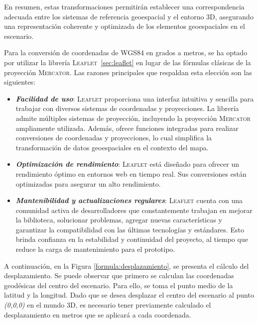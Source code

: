 \documentclass[a4paper, 11pt]{book}
\begin{document}
En resumen, estas transformaciones permitirán establecer una correspondencia adecuada entre los sistemas de referencia geoespacial y el entorno 3D, asegurando una representación coherente y optimizada de los elementos geoespaciales en el escenario.

Para la conversión de coordenadas de \textsc{WGS84} en grados a metros, se ha optado por utilizar la librería \textsc{Leaflet}~\ref{sec:leaflet} en lugar de las fórmulas clásicas de la proyección \textsc{Mercator}. Las razones principales que respaldan esta elección son las siguientes:
\begin{itemize}
    \item \textbf{\emph{Facilidad de uso}}: \textsc{Leaflet} proporciona una interfaz intuitiva y sencilla para trabajar con diversos sistemas de coordenadas y proyecciones. La librería admite múltiples sistemas de proyección, incluyendo la proyección \textsc{Mercator} ampliamente utilizada. 
    Además, ofrece funciones integradas para realizar conversiones de coordenadas y proyecciones, lo cual simplifica la transformación de datos geoespaciales en el contexto del mapa.
    \item \textbf{\emph{Optimización de rendimiento}}: \textsc{Leaflet} está diseñado para ofrecer un rendimiento óptimo en entornos web en tiempo real. Sus conversiones están optimizadas para asegurar un alto rendimiento.
    \item \textbf{\emph{Mantenibilidad y actualizaciones regulares}}: \textsc{Leaflet} cuenta con una comunidad activa de desarrolladores que constantemente trabajan en mejorar la biblioteca, solucionar problemas, agregar nuevas características y garantizar la compatibilidad con las últimas tecnologías y estándares. Esto brinda confianza en la estabilidad y continuidad del proyecto, al tiempo que reduce la carga de mantenimiento para el prototipo.
\end{itemize}
A continuación, en la Figura \ref{formula:desplazamiento}, se presenta el cálculo del desplazamiento. Se puede observar que primero se calculan las coordenadas geodésicas del centro del escenario. Para ello, se toma el punto medio de la latitud y la longitud. Dado que se desea desplazar el centro del escenario al punto \emph{(0,0,0)} en el mundo \textsc{3D}, es necesario tener previamente calculado el desplazamiento en metros que se aplicará a cada coordenada.
\end{document}
